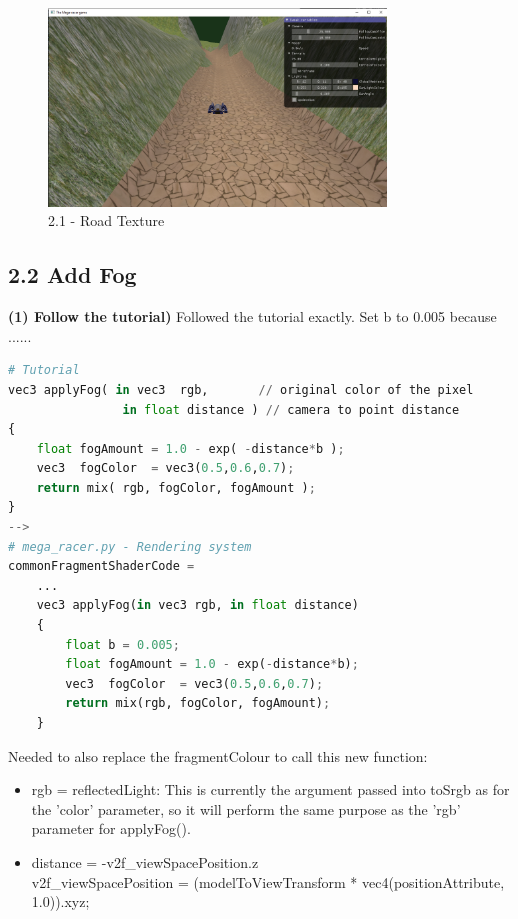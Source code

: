 \documentclass[a4 paper, 12pt]{article}
\begin{document}
    \begin{figure} [H]
        \centering
        \includegraphics[width=0.8\textwidth, frame]
            {./images/2.1_c_final.PNG}
        \caption{2.1 - Road Texture}   
    \end{figure}

\subsection{2.2 Add Fog}

\textbf{(1) Follow the tutorial)}
Followed the tutorial exactly. Set b to 0.005 because ......

\begin{lstlisting}[language=python]
# Tutorial
vec3 applyFog( in vec3  rgb,       // original color of the pixel
                in float distance ) // camera to point distance
{
    float fogAmount = 1.0 - exp( -distance*b );
    vec3  fogColor  = vec3(0.5,0.6,0.7);
    return mix( rgb, fogColor, fogAmount );
}
-->
# mega_racer.py - Rendering system
commonFragmentShaderCode = 
    ...
    vec3 applyFog(in vec3 rgb, in float distance)
    {
        float b = 0.005;
        float fogAmount = 1.0 - exp(-distance*b);
        vec3  fogColor  = vec3(0.5,0.6,0.7);
        return mix(rgb, fogColor, fogAmount);
    }
\end{lstlisting} 

Needed to also replace the fragmentColour to call this new function:
    \begin{itemize}
        \item rgb = reflectedLight: This is currently the argument passed into toSrgb as for the 'color' parameter, so it will perform the same purpose as the 'rgb' parameter for applyFog().
        \item distance = -v2f\_viewSpacePosition.z \\      
        v2f\_viewSpacePosition = (modelToViewTransform * vec4(positionAttribute, 1.0)).xyz;
    \end{itemize}
\end{document}
